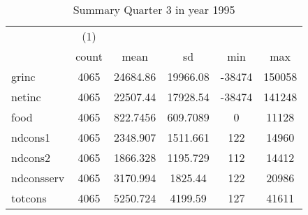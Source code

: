 \begin{table}[htbp]\centering
\def\sym#1{\ifmmode^{#1}\else\(^{#1}\)\fi}
\caption{Summary Quarter 3 in year 1995 \label{sum\_Q3\_y1995}}
\begin{tabular}{l*{1}{ccccc}}
\hline\hline
            &\multicolumn{1}{c}{(1)}&            &            &            &            \\
            &       count&        mean&          sd&         min&         max\\
\hline
grinc       &        4065&    24684.86&    19966.08&      -38474&      150058\\
netinc      &        4065&    22507.44&    17928.54&      -38474&      141248\\
food        &        4065&    822.7456&    609.7089&           0&       11128\\
ndcons1     &        4065&    2348.907&    1511.661&         122&       14960\\
ndcons2     &        4065&    1866.328&    1195.729&         112&       14412\\
ndconsserv  &        4065&    3170.994&     1825.44&         122&       20986\\
totcons     &        4065&    5250.724&     4199.59&         127&       41611\\
\hline\hline
\end{tabular}
\end{table}
